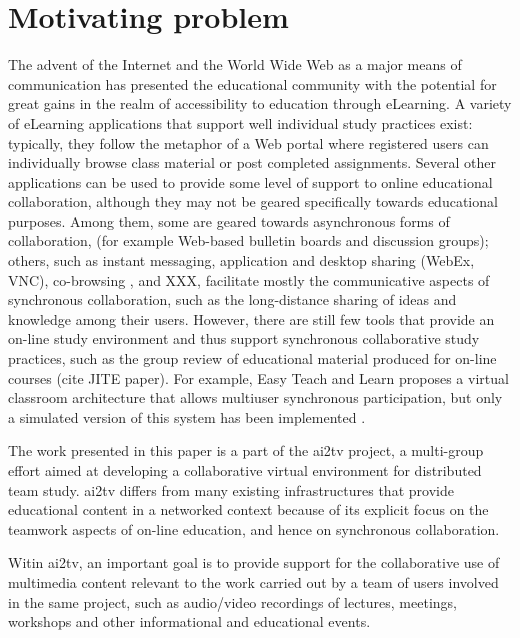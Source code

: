 \documentclass{sig-alternate}
\begin{document}
\section{Motivating problem} \label{background}
The advent of the Internet and the World Wide Web as a major means of
communication has presented the educational community with the
potential for great gains in the realm of accessibility to education
through eLearning.  A variety of eLearning applications that support
well individual study practices exist: typically, they follow the
metaphor of a Web portal where registered users can individually
browse class material or post completed assignments.  Several other
applications can be used to provide some level of support to online
educational collaboration, although they may not be geared
specifically towards educational purposes. Among them, some are geared
towards asynchronous forms of collaboration, (for example Web-based
bulletin boards and discussion groups); others, such as instant
messaging, application and desktop sharing (WebEx, VNC), co-browsing
\cite{CAPPS, LIEBERMAN, SIDLER}, and XXX, facilitate mostly the
communicative aspects of synchronous collaboration, such as the
long-distance sharing of ideas and knowledge among their users.
However, there are still few tools that provide an on-line study
environment and thus support synchronous collaborative study
practices, such as the group review of educational material produced
for on-line courses (cite JITE paper).  For example, Easy Teach and
Learn proposes a virtual classroom architecture that allows multiuser
synchronous participation, but only a simulated version of this system
has been implemented \cite{WALTER}.

The work presented in this paper is a part of the ai2tv project, a
multi-group effort aimed at developing a collaborative virtual
environment for distributed team study.  ai2tv differs from many
existing infrastructures that provide educational content in a
networked context because of its explicit focus on the teamwork
aspects of on-line education, and hence on synchronous collaboration.

Witin ai2tv, an important goal is to provide support for the
collaborative use of multimedia content relevant to the work carried
out by a team of users involved in the same project, such as
audio/video recordings of lectures, meetings, workshops and other
informational and educational events.
\end{document}
